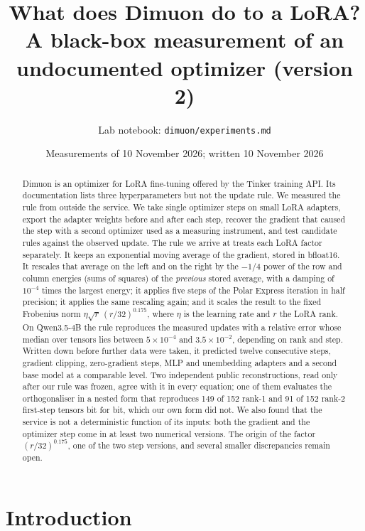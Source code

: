 \documentclass[11pt]{article}
\title{What does Dimuon do to a LoRA?\\[2pt]
\large A black-box measurement of an undocumented optimizer (version 2)}
\author{Lab notebook: \texttt{dimuon/experiments.md}}
\date{Measurements of 10 November 2026; written 10 November 2026}
\begin{document}
\maketitle

\begin{abstract}
Dimuon is an optimizer for LoRA fine-tuning offered by the Tinker training API. Its documentation
lists three hyperparameters but not the update rule. We measured the rule from outside the service.
We take single optimizer steps on small LoRA adapters, export the adapter weights before and after
each step, recover the gradient that caused the step with a second optimizer used as a measuring
instrument, and test candidate rules against the observed update. The rule we arrive at treats each
LoRA factor separately. It keeps an exponential moving average of the gradient, stored in bfloat16.
It rescales that average on the left and on the right by the $-1/4$ power of the row and column
energies (sums of squares) of the \emph{previous} stored average, with a damping of $10^{-4}$ times
the largest energy; it applies five steps of the Polar Express iteration in half precision; it
applies the same rescaling again; and it scales the result to the fixed Frobenius norm
$\eta\sqrt r\,(r/32)^{0.175}$, where $\eta$ is the learning rate and $r$ the LoRA rank. On
Qwen3.5-4B the rule reproduces the measured updates with a relative error whose median over tensors
lies between $5\times10^{-4}$ and $3.5\times10^{-2}$, depending on rank and step. Written down
before further data were taken, it predicted twelve consecutive steps, gradient clipping,
zero-gradient steps, MLP and unembedding adapters and a second base model at a comparable level.
Two independent public reconstructions, read only after our rule was frozen, agree with it in every
equation; one of them evaluates the orthogonaliser in a nested form that reproduces 149 of 152 rank-1
and 91 of 152 rank-2 first-step tensors bit for bit, which our own form did not. We also found that the service is not a
deterministic function of its inputs: both the gradient and the optimizer step come in at least two
numerical versions. The origin of the factor $(r/32)^{0.175}$, one of the two step versions, and
several smaller discrepancies remain open.
\end{abstract}

\tableofcontents

\section{Introduction}\label{sec:intro}
\end{document}
